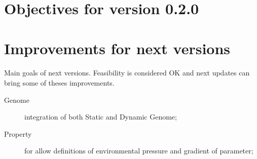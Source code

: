 \documentclass{report} %
\begin{document}
    \section*{Objectives for version \textbf{0.2.0}}
    \paragraph*{}
    \begin{description}
    \end{description}




\section*{Improvements for next versions}
    \paragraph*{}
    Main goals of next versions. Feasibility is considered OK and next updates can bring some of theses improvements.
    \begin{description}
            \item[Genome] integration of both Static and Dynamic Genome;
            \item[Property] for allow definitions of environmental pressure and gradient of parameter;
    \end{description}
\end{document}
